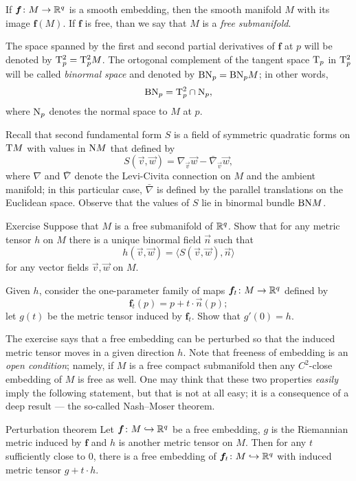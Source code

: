 If $\bm{f}\colon M\to \mathbb{R}^q$ is a smooth embedding, then the smooth manifold $M$ with its image $\bm{f}(M)$.
If $\bm{f}$ is free, than we say that $M$ is a \emph{free submanifold}.

The space spanned by the first and second partial derivatives of $\bm{f}$ at $p$ will be denoted by $\mathrm{T}^2_p=\mathrm{T}^2_pM$.
The ortogonal complement of the tangent space $\mathrm{T}_p$ in $\mathrm{T}^2_p$ will be called \emph{binormal space} and denoted by $\mathrm{BN}_p=\mathrm{BN}_pM$; in other words,
\[\mathrm{BN}_p=\mathrm{T}^2_p\cap\mathrm{N}_p,\]
where $\mathrm{N}_p$ denotes the normal space to $M$ at $p$.

Recall that second fundamental form $S$ is a field of symmetric quadratic forms on $\mathrm{T} M$  with values in $\mathrm{N} M$ that defined by 
\[S(\vec v,\vec w)=\nabla_{\vec v}\vec w-\bar\nabla_{\vec v}\vec w,\]
where $\nabla$ and $\bar \nabla$ denote the Levi-Civita connection on $M$ and the ambient manifold;
in this particular case, $\bar \nabla$ is defined by the parallel translations on the Euclidean space.
Observe that the values of $S$ lie in binormal bundle $\mathrm{BN} M$.

\begin{thm}{Exercise}\label{ex:binormal}
Suppose that $M$ is a free submanifold of $\mathbb{R}^q$.
Show that for any metric tensor $h$ on $M$ there is a unique binormal field $\vec n$ such  that 
\[h(\vec v,\vec w)=\langle S(\vec v,\vec w),\vec n\rangle\]
for any vector fields $\vec v,\vec w$ on $M$.

Given $h$, consider the one-parameter family of maps $\bm{f}_t\colon M\to \mathbb{R}^q$ defined by 
\[\bm{f}_t(p)= p+t\cdot \vec n(p);\]
let $g(t)$ be the metric tensor induced by $\bm{f}_t$.
Show that $g'(0)=h$.
\end{thm}

The exercise says that a free embedding can be perturbed so that the induced metric tensor moves in a given direction $h$.
Note that freeness of embedding is an \emph{open condition};
namely, if $M$ is a free compact submanifold then any $C^2$-close embedding of $M$ is free as well.
One may think that these two properties \emph{easily} imply the following statement,
but that is not at all easy;
it is a consequence of a deep result --- the so-called Nash--Moser theorem.

\begin{thm}{Perturbation theorem}\label{thm:perturbation}
Let $\bm{f}\colon M\hookrightarrow\mathbb{R}^q$ be a free embedding, $g$ is the Riemannian metric induced by $\bm{f}$ and $h$ is another metric tensor on $M$.
Then for any $t$ sufficiently close to $0$, there is a free embedding of $\bm{f}_t\colon M\hookrightarrow\mathbb{R}^q$ with  induced metric tensor $g+t\cdot h$.  
\end{thm}

